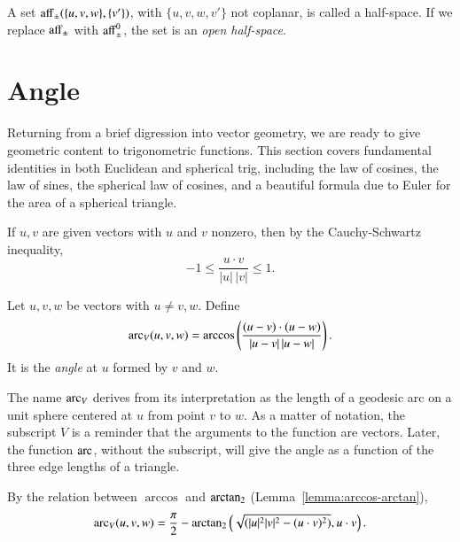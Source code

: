 \begin{definition} A set ${\operatorname{aff}}_{\pm}(\{u,v,w\},\{v'\})$,
with $\{u,v,w,v'\}$ not coplanar, is called a half-space.  If
we replace ${\operatorname{aff}}_{\pm}$ with ${\operatorname{aff}}_{\pm}^0$, the set is an
{\it open half-space}.
\end{definition}

\section{Angle}\label{sec:angle}

Returning from a brief digression into vector geometry, we
are ready to give geometric content to trigonometric functions.
This section covers fundamental identities
in both Euclidean and spherical trig, including the law
of cosines, the law of sines, the spherical law of cosines, 
and a beautiful formula due to Euler for
the area of a spherical triangle.

If $u,v$ are given vectors with $u$ and $v$ nonzero, then by the
Cauchy-Schwartz inequality,
    $$-1 \le \frac{u\cdot v}{|u|\,|v|} \le 1.$$

\begin{definition}\label{def:angle}
Let $u,v,w$ be vectors with $u\ne v,w$.
Define
    $$
    \operatorname{arc}_V(u,v,w) = \arccos\left(\frac{(u-v)\cdot (u-w)}{|u-v|\,|u-w|}\right).
    $$
It is the {\it angle} at $u$ formed by $v$ and $w$.
\end{definition}

The name $\operatorname{arc}_V$ derives from its interpretation as the
length of a geodesic arc on a unit sphere
centered at $u$ from point $v$ to $w$.
As a matter of notation, the subscript $V$ is a reminder that
the arguments to the function are vectors.  Later, the function
$\operatorname{arc}$, without the subscript, will give the angle as a function
of the three edge lengths of a triangle.




By the relation between $\arccos$ and ${\operatorname{arctan_2}}$
(Lemma~\ref{lemma:arccos-arctan}), %
    \begin{equation}\label{eqn:angle}
    \operatorname{arc}_V(u,v,w) = \frac{\pi}2 - {\operatorname{arctan_2}}\left ({\sqrt{(|u|^2|v|^2 -
    (u\cdot v)^2)}}, {u\cdot v}\right).
    \end{equation}

